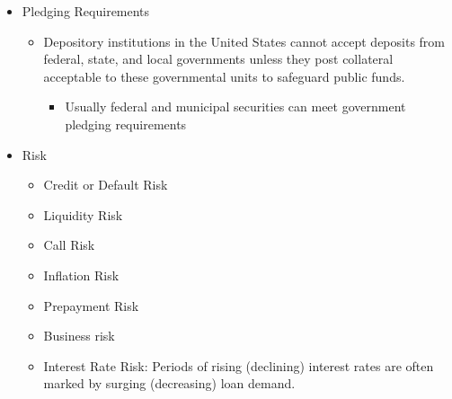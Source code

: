 \begin{itemize}
\begin{itemize}
\begin{itemize}
        Result: take substantial short-run losses in return for the prospect of higher long-run profits.
        \end{itemize}
    \end{itemize}
\item Pledging Requirements
    \begin{itemize}
    \item Depository institutions in the United States cannot accept deposits from federal, state, and local governments unless they post collateral acceptable to these governmental units to safeguard public funds.
        \begin{itemize}
        \item Usually federal and municipal securities can meet government pledging requirements
        \end{itemize}
    \end{itemize}
\item Risk
    \begin{itemize}
    \item Credit or Default Risk
    \item Liquidity Risk
    \item Call Risk
    \item Inflation Risk
    \item Prepayment Risk
    \item Business risk
    \item Interest Rate Risk: Periods of rising (declining) interest rates are often marked by surging (decreasing) loan demand.
    \end{itemize}
\end{itemize}



